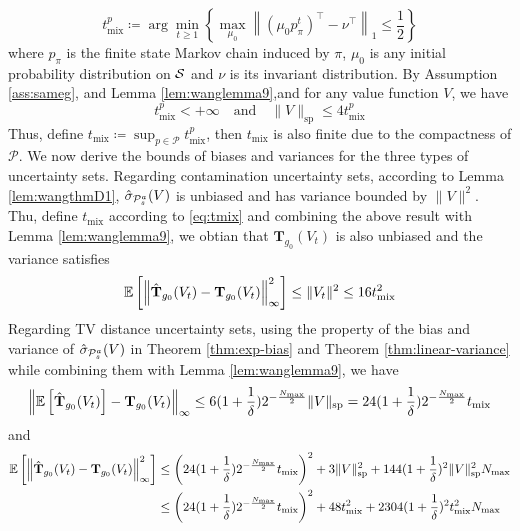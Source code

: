 \begin{equation}
    t^p_{\mathrm{mix}}\coloneqq\arg\min_{t \geq 1} \left\{ \max_{\mu_0} \left\| (\mu_0 p_{\pi}^{t})^{\top} - \nu^{\top} \right\|_1 \leq \frac{1}{2} \right\}
\end{equation}
where $p_\pi$ is the finite state Markov chain induced by $\pi$, $\mu_0$ is any initial probability distribution on $\mathcal{S}$ and $\nu$ is its invariant distribution. By Assumption \ref{ass:sameg}, and Lemma \ref{lem:wanglemma9},and for any value function $V$, we have
    \begin{equation}
         t^p_{\mathrm{mix}} < +\infty \quad \text{and} \quad\|V\|_{\mathrm{sp}} \leq 4t^p_{\mathrm{mix}}
    \end{equation}
Thus, define $t_{\mathrm{mix}} \coloneqq \sup_{p\in\mathcal{P}} t^p_{\mathrm{mix}}$, then $t_{\mathrm{mix}}$ is also finite due to the compactness of $\mathcal{P}$. We now derive the bounds of biases and variances for the three types of uncertainty sets. Regarding contamination uncertainty sets, according to Lemma \ref{lem:wangthmD1}, $\hat{\sigma}_{\mathcal{P}^a_s}(V)$ is unbiased and has variance bounded by $\|V\|^2$. Thu, define $t_{\mathrm{mix}}$ according to \eqref{eq:tmix} and combining the above result with Lemma \ref{lem:wanglemma9}, we obtian that $\hat{\mathbf{T}}_{g_0}(V_t)$ is also unbiased and the variance satisfies
\begin{equation}
    \mathbb{E}\left[\left\lVert\hat{\mathbf{T}}_{g_0}(V_t)-{\mathbf{T}}_{g_0}(V_t)\right\rVert^2_\infty\right] \leq \|V_t\|^2 \leq 16t^2_{\mathrm{mix}}
\end{equation}
Regarding TV distance uncertainty sets, using the property of the bias and variance of $\hat{\sigma}_{\mathcal{P}^a_s}(V)$ in Theorem \ref{thm:exp-bias} and Theorem \ref{thm:linear-variance} while combining them with Lemma \ref{lem:wanglemma9}, we have
\begin{equation}
        \left\lVert\mathbb{E}\left[\hat{\mathbf{T}}_{g_0}(V_t)\right]-{\mathbf{T}}_{g_0}(V_t)\right\rVert_\infty \leq 6(1+\frac{1}{\delta}) 2^{-\frac{N_{\max}}{2}}\|V\|_{\mathrm{sp}}= 24(1+\frac{1}{\delta}) 2^{-\frac{N_{\max}}{2}}t_{\mathrm{mix}}
\end{equation}
and
\begin{align}
        \mathbb{E}\left[\left\lVert\hat{\mathbf{T}}_{g_0}(V_t)-{\mathbf{T}}_{g_0}(V_t)\right\rVert^2_\infty\right] &\leq \left( 24(1+\frac{1}{\delta}) 2^{-\frac{N_{\max}}{2}}t_{\mathrm{mix}} \right)^2 + 3\|V\|_{\mathrm{sp}}^2 + 144(1+\frac{1}{\delta})^2\|V\|_{\mathrm{sp}}^2 N_{\max} \nonumber\\
        &\leq \left( 24(1+\frac{1}{\delta}) 2^{-\frac{N_{\max}}{2}}t_{\mathrm{mix}} \right)^2 + 48t_{\mathrm{mix}}^2 + 2304(1+\frac{1}{\delta})^2t_{\mathrm{mix}}^2 N_{\max}
\end{align}
